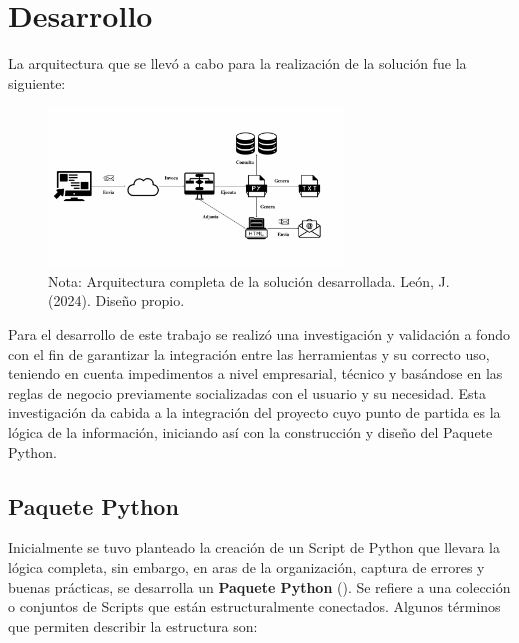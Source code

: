 \documentclass[letter,oneside,12pt,spanish]{report}
\begin{document}

\newpage

\chapter{Desarrollo}

\noindent La arquitectura que se llevó a cabo para la realización de la solución fue la siguiente:

\begin{figure}[ht]
    \centering
    \includegraphics[width=0.7\textwidth]{Figs/ARQUITECTURA.png}
    \label{fig:Arquitectura}
    \\Nota: Arquitectura completa de la solución desarrollada. León, J. (2024). Diseño propio.
\end{figure}



\noindent Para el desarrollo de este trabajo se realizó una investigación y validación a fondo con el fin de garantizar la integración entre las herramientas y su correcto uso, teniendo en cuenta impedimentos a nivel empresarial, técnico y basándose en las reglas de negocio previamente socializadas con el usuario y su necesidad. Esta investigación da cabida a la integración del proyecto cuyo punto de partida es la lógica de la información, iniciando así con la construcción y diseño del Paquete Python.

\section{Paquete Python}

\noindent Inicialmente se tuvo planteado la creación de un Script de Python que llevara la lógica completa, sin embargo, en aras de la organización, captura de errores y buenas prácticas, se desarrolla un \textbf{Paquete Python} (\cite{Beazley2013, Lutz2013}). Se refiere a una colección o conjuntos de Scripts que están estructuralmente conectados. Algunos términos que permiten describir la estructura son:
\end{document}
